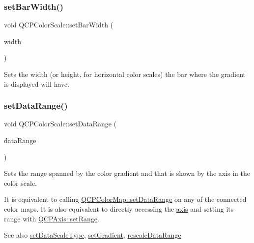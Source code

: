 \subsubsection{\texorpdfstring{set\+Bar\+Width()}{setBarWidth()}}
{\footnotesize\ttfamily void Q\+C\+P\+Color\+Scale\+::set\+Bar\+Width (\begin{DoxyParamCaption}\item[{int}]{width }\end{DoxyParamCaption})}

Sets the width (or height, for horizontal color scales) the bar where the gradient is displayed will have. \mbox{\label{classQCPColorScale_abe88633003a26d1e756aa74984587fef}} 
\subsubsection{\texorpdfstring{set\+Data\+Range()}{setDataRange()}}
{\footnotesize\ttfamily void Q\+C\+P\+Color\+Scale\+::set\+Data\+Range (\begin{DoxyParamCaption}\item[{const \hyperlink{classQCPRange}{Q\+C\+P\+Range} \&}]{data\+Range }\end{DoxyParamCaption})}

Sets the range spanned by the color gradient and that is shown by the axis in the color scale.

It is equivalent to calling \hyperlink{classQCPColorMap_a980b42837821159786a85b4b7dcb8774}{Q\+C\+P\+Color\+Map\+::set\+Data\+Range} on any of the connected color maps. It is also equivalent to directly accessing the \hyperlink{classQCPColorScale_a39bdbdb3b212602a5a57f9f3ea444190}{axis} and setting its range with \hyperlink{classQCPAxis_aebdfea5d44c3a0ad2b4700cd4d25b641}{Q\+C\+P\+Axis\+::set\+Range}.

\begin{DoxySeeAlso}{See also}
\hyperlink{classQCPColorScale_aeb6107d67dd7325145b2498abae67fc3}{set\+Data\+Scale\+Type}, \hyperlink{classQCPColorScale_a1f29583bb6f1e7f473b62fb712be3940}{set\+Gradient}, \hyperlink{classQCPColorScale_a425983db4478543924ddbd04ea20a356}{rescale\+Data\+Range} 
\end{DoxySeeAlso}
\mbox{\label{classQCPColorScale_aeb6107d67dd7325145b2498abae67fc3}} 
